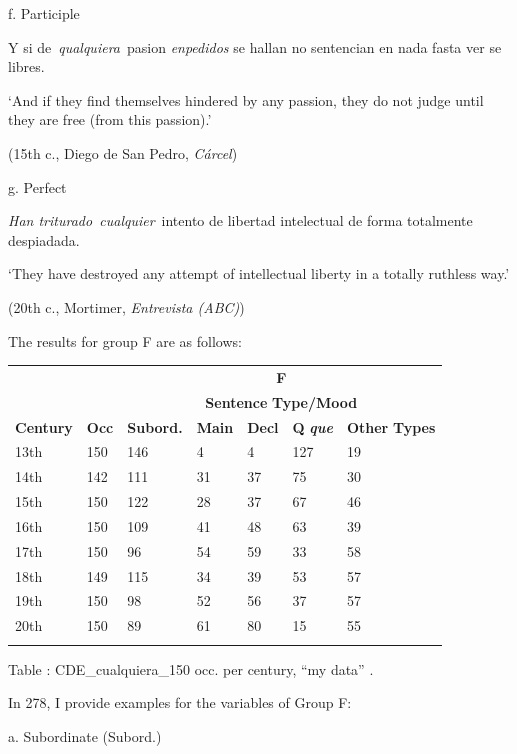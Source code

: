 \documentclass[output=paper]{langscibook}
\begin{document}
  f.  Participle

    Y si de~\textit{qualquiera}~pasion \textit{enpedidos} se hallan no sentencian en nada fasta ver se libres. 

    ‘And if they find themselves hindered by any passion, they do not judge until they are free (from this passion).’

    (15th c., Diego de San Pedro, \textit{Cárcel})

  g.  Perfect

    \textit{Han triturado~cualquier}~intento de libertad intelectual de forma totalmente despiadada. 

    ‘They have destroyed any attempt of intellectual liberty in a totally ruthless way.’

    (20th c., Mortimer, \textit{Entrevista (ABC)})

The results for group F are as follows:


\begin{tabularx}{\textwidth}{XXXXXXX}

\lsptoprule
\multicolumn{1}{c}{} &  & \multicolumn{5}{c}{ \textbf{F}}\\
\multicolumn{1}{c}{} &  & \multicolumn{5}{c}{ \textbf{Sentence} \textbf{Type/Mood}}\\
 \textbf{Century} & \textbf{Occ} & \textbf{Subord.} & \textbf{Main} & \textbf{Decl} & \textbf{Q} \textbf{\textit{que}} & \textbf{Other} \textbf{Types}\\
 13th & 150 & 146 & 4 & 4 & 127 & 19\\
 14th & 142 & 111 & 31 & 37 & 75 & 30\\
 15th & 150 & 122 & 28 & 37 & 67 & 46\\
 16th & 150 & 109 & 41 & 48 & 63 & 39\\
 17th & 150 & 96 & 54 & 59 & 33 & 58\\
 18th & 149 & 115 & 34 & 39 & 53 & 57\\
 19th & 150 & 98 & 52 & 56 & 37 & 57\\
 20th & 150 & 89 & 61 & 80 & 15 & 55\\
\lspbottomrule
\end{tabularx}
Table : CDE\_cualquiera\_150 occ. per century, “my data” .

In 278, I provide examples for the variables of Group F:

  a.  Subordinate (Subord.)
\end{document}
